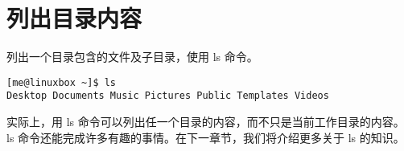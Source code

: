 \section{列出目录内容} %
\label{sec:列出目录内容}

列出一个目录包含的文件及子目录，使用 ls 命令。

\begin{lstlisting}
[me@linuxbox ~]$ ls
Desktop Documents Music Pictures Public Templates Videos
\end{lstlisting}

\par 实际上，用 ls 命令可以列出任一个目录的内容，而不只是当前工作目录的内容。 ls 命令还能完成许多有趣的事情。在下一章节，我们将介绍更多关于 ls 的知识。
